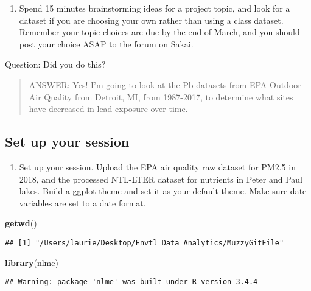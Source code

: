 \documentclass[]{article}
\newenvironment{Shaded}{\begin{snugshade}}{\end{snugshade}}
\newcommand{\KeywordTok}[1]{\textcolor[rgb]{0.13,0.29,0.53}{\textbf{#1}}}
\newcommand{\NormalTok}[1]{#1}
\providecommand{\tightlist}{%
  \setlength{\itemsep}{0pt}\setlength{\parskip}{0pt}}
\begin{document}
\begin{enumerate}
\def\labelenumi{\arabic{enumi}.}
\tightlist
\item
  Spend 15 minutes brainstorming ideas for a project topic, and look for
  a dataset if you are choosing your own rather than using a class
  dataset. Remember your topic choices are due by the end of March, and
  you should post your choice ASAP to the forum on Sakai.
\end{enumerate}

Question: Did you do this?

\begin{quote}
ANSWER: Yes! I'm going to look at the Pb datasets from EPA Outdoor Air
Quality from Detroit, MI, from 1987-2017, to determine what sites have
decreased in lead exposure over time.
\end{quote}

\subsection{Set up your session}\label{set-up-your-session}

\begin{enumerate}
\def\labelenumi{\arabic{enumi}.}
\setcounter{enumi}{1}
\tightlist
\item
  Set up your session. Upload the EPA air quality raw dataset for PM2.5
  in 2018, and the processed NTL-LTER dataset for nutrients in Peter and
  Paul lakes. Build a ggplot theme and set it as your default theme.
  Make sure date variables are set to a date format.
\end{enumerate}

\begin{Shaded}
\begin{Highlighting}[]
\KeywordTok{getwd}\NormalTok{()}
\end{Highlighting}
\end{Shaded}

\begin{verbatim}
## [1] "/Users/laurie/Desktop/Envtl_Data_Analytics/MuzzyGitFile"
\end{verbatim}

\begin{Shaded}
\begin{Highlighting}[]
\KeywordTok{library}\NormalTok{(nlme)}
\end{Highlighting}
\end{Shaded}

\begin{verbatim}
## Warning: package 'nlme' was built under R version 3.4.4
\end{verbatim}
\end{document}
